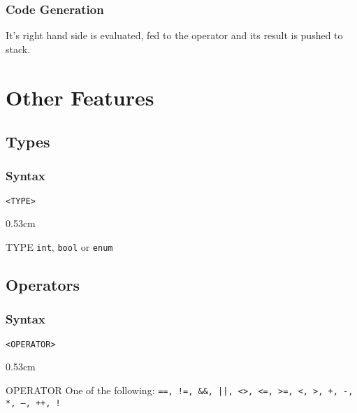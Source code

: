\documentclass[twoside]{report}
\newenvironment{mycompactdesc}{\begin{adjustwidth}{0.53cm}{}\begin{compactdesc}}{\end{compactdesc}\end{adjustwidth}}
\begin{document}
\subsubsection*{Code Generation}
It's right hand side is evaluated, fed to the operator and its result is pushed to stack.


\section{Other Features}
\label{def:other_features}


\subsection{Types}
\label{def:types}
\subsubsection*{Syntax}
\texttt{<TYPE>}
\begin{mycompactdesc}
	\item[TYPE] \texttt{int}, \texttt{bool} or \texttt{enum}
\end{mycompactdesc}


\subsection{Operators}
\label{def:operators}
\subsubsection*{Syntax}
\texttt{<OPERATOR>}
\begin{mycompactdesc}
	\item[OPERATOR] One of the following: \texttt{==, !=, \&\&, ||, <>, <=, >=, <, >, +, -, *, --, ++, !}
\end{mycompactdesc}
\end{document}
